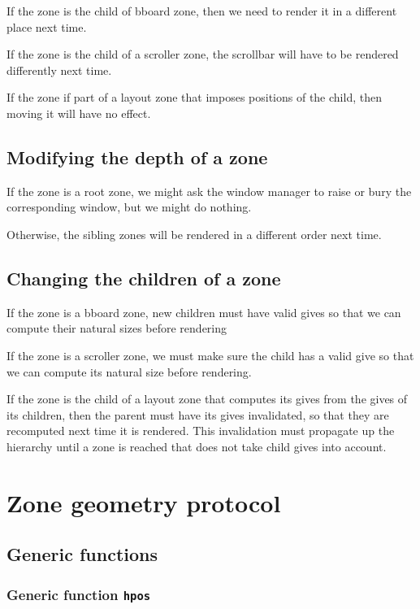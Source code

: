 \documentclass{report}
\begin{document}
If the zone is the child of bboard zone, then we need to render it in
a different place next time. 

If the zone is the child of a scroller zone, the scrollbar will have
to be rendered differently next time. 

If the zone if part of a layout zone that imposes positions of the
child, then moving it will have no effect. 

\subsection{Modifying the depth of a zone}

If the zone is a root zone, we might ask the window manager to raise
or bury the corresponding window, but we might do nothing. 

Otherwise, the sibling zones will be rendered in a different order
next time.

\subsection{Changing the children of a zone}

If the zone is a bboard zone, new children must have valid gives so
that we can compute their natural sizes before rendering

If the zone is a scroller zone, we must make sure the child has a
valid give so that we can compute its natural size before rendering.

If the zone is the child of a layout zone that computes its gives from
the gives of its children, then the parent must have its gives
invalidated, so that they are recomputed next time it is rendered.
This invalidation must propagate up the hierarchy until a zone is
reached that does not take child gives into account. 

\section{Zone geometry protocol}

\subsection{Generic functions}

\subsubsection{Generic function \texttt{hpos}}
\end{document}
